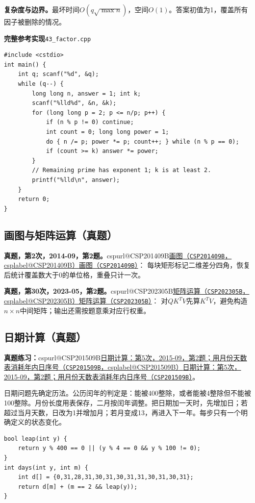 \documentclass[UTF8,11pt,a4paper,fontset=none]{ctexart}
\makeatletter
\newcommand{\csp}[2]{\ifcsname cspurl@#1\endcsname\href{\csname cspurl@#1\endcsname}{#2（\texttt{#1}，\csname csplabel@#1\endcsname）}\else\href{https://oj.shumeng.tech/p/#1}{#2（\texttt{#1}）}\fi}
\newcommand{\ojpractice}[2]{\par\noindent\textbf{真题练习：}\csp{#1}{#2}。\par}
\makeatother
\begin{document}
\noindent\textbf{复杂度与边界。}最坏时间$O(q\sqrt{\max n})$，空间$O(1)$。答案初值为1，覆盖所有因子被删除的情况。
\par\noindent\begin{minipage}{\linewidth}
\textbf{完整参考实现}\quad\texttt{43\_factor.cpp}
\begin{lstlisting}
#include <cstdio>
int main() {
    int q; scanf("%d", &q);
    while (q--) {
        long long n, answer = 1; int k;
        scanf("%lld%d", &n, &k);
        for (long long p = 2; p <= n/p; p++) {
            if (n % p != 0) continue;
            int count = 0; long long power = 1;
            do { n /= p; power *= p; count++; } while (n % p == 0);
            if (count >= k) answer *= power;
        }
        // Remaining prime has exponent 1; k is at least 2.
        printf("%lld\n", answer);
    }
    return 0;
}
\end{lstlisting}
\end{minipage}\par


\subsection{画图与矩阵运算（真题）}
\textbf{真题，第2次，2014-09，第2题。}\csp{CSP201409B}{画图}：
每块矩形标记二维差分四角，恢复后统计覆盖数大于0的单位格，重叠只计一次。

\textbf{真题，第30次，2023-05，第2题。}\csp{CSP202305B}{矩阵运算}：
对$QK^TV$先算$K^TV$，避免构造$n\times n$中间矩阵；输出还需按题意乘对应行权重。
\subsection{日期计算（真题）}\ojpractice{CSP201509B}{日期计算：第5次，2015-09，第2题；用月份天数表消耗年内日序号}
日期问题先确定历法。公历闰年的判定是：能被400整除，或者能被4整除但不能被100整除。月份长度用表保存，二月按闰年调整。把日期加一天时，先增加日；若超过当月天数，日改为1并增加月；若月变成13，再进入下一年。每步只有一个明确定义的状态变化。

\par\noindent\begin{minipage}{\linewidth}
\begin{lstlisting}
bool leap(int y) {
    return y % 400 == 0 || (y % 4 == 0 && y % 100 != 0);
}
int days(int y, int m) {
    int d[] = {0,31,28,31,30,31,30,31,31,30,31,30,31};
    return d[m] + (m == 2 && leap(y));
}
\end{lstlisting}
\end{minipage}\par
\end{document}
